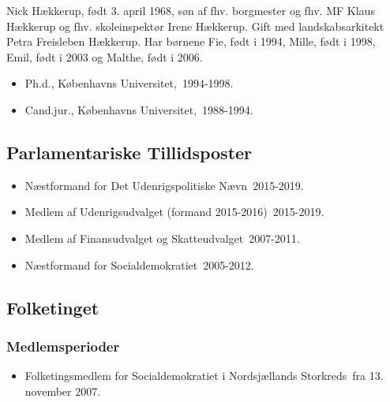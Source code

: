 \documentclass[11pt, a4paper]{awesome-cv}
\begin{document}
\makecvheader[R]
\makelettertitle
\begin{cvletter}
Nick Hækkerup, født 3. april 1968, søn af fhv. borgmester og fhv. MF Klaus Hækkerup og fhv. skoleinspektør Irene Hækkerup. Gift med landskabsarkitekt Petra Freisleben Hækkerup. Har børnene Fie, født i 1994, Mille, født i 1998, Emil, født i 2003 og Malthe, født i 2006.

\begin{itemize}
\item Ph.d., Københavns Universitet, 1994-1998.
\item Cand.jur., Københavns Universitet, 1988-1994.
\end{itemize}
\subsection*{Parlamentariske Tillidsposter}
\begin{itemize}
\item Næstformand for Det Udenrigspolitiske Nævn 2015-2019.
\item Medlem af Udenrigsudvalget (formand 2015-2016) 2015-2019.
\item Medlem af Finansudvalget og Skatteudvalget 2007-2011.
\item Næstformand for Socialdemokratiet 2005-2012.
\end{itemize}
\subsection*{Folketinget}
\subsubsection*{Medlemsperioder}
\begin{itemize}
\item Folketingsmedlem for Socialdemokratiet i Nordsjællands Storkreds fra 13. november 2007.
\end{itemize}

\end{cvletter}
\end{document}
